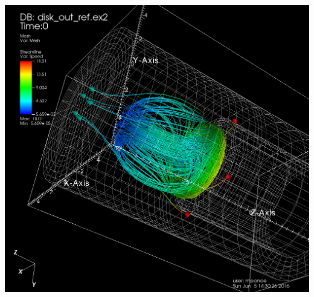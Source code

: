 \begin{frame}
\begin{columns}
\begin{column}{3cm}
	\includegraphics[width=.9\columnwidth]{figs/visit-handson/disk_out_ref-streamlines}
\end{column}
\end{columns}
\end{frame}

